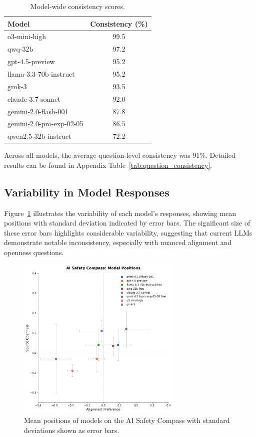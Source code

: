 \begin{table}[htbp]
    \centering
    \caption{Model-wide consistency scores.}
    \label{tab:model_consistency}
    \begin{tabular}{l c}
        \hline
        Model & Consistency (\%) \\
        \hline
        o3-mini-high & 99.5 \\
        qwq-32b & 97.2 \\
        gpt-4.5-preview & 95.2 \\
        llama-3.3-70b-instruct & 95.2 \\
        grok-3 & 93.5 \\
        claude-3.7-sonnet & 92.0 \\
        gemini-2.0-flash-001 & 87.8 \\
        gemini-2.0-pro-exp-02-05 & 86.5 \\
        qwen2.5-32b-instruct & 72.2 \\
        \hline
    \end{tabular}
\end{table}


Across all models, the average question-level consistency was 91\%. Detailed results can be found in Appendix Table~\ref{tab:question_consistency}.

\subsection{Variability in Model Responses}

Figure~\ref{fig:compass_variance} illustrates the variability of each model's responses, showing mean positions with standard deviation indicated by error bars. The significant size of these error bars highlights considerable variability, suggesting that current LLMs demonstrate notable inconsistency, especially with nuanced alignment and openness questions.

\begin{figure}[htbp]
    \centering
    \includegraphics[width=0.7\textwidth]{figures/compass_with_error_bars.png}
    \caption{Mean positions of models on the AI Safety Compass with standard deviations shown as error bars.}
    \label{fig:compass_variance}
\end{figure}

